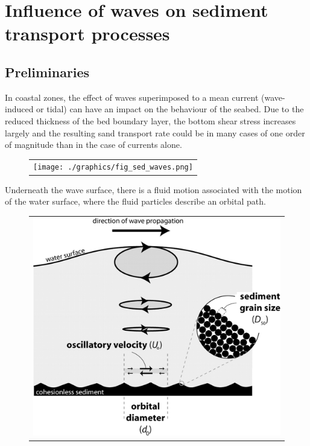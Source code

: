 \chapter[Influence of waves on sediment transport]{Influence of waves on sediment transport processes}

\section{Preliminaries}
In coastal zones, the effect of waves superimposed to a mean current (wave-induced or tidal) can have an impact on the behaviour of the seabed. Due to the reduced thickness of the bed boundary layer, the bottom shear stress increases largely and the resulting sand transport rate could be in many cases of one order of magnitude than in the case of currents alone. 

\begin{figure}[H]%
  \begin{center}
\begin{tabular}{c}
\texttt{[image: ./graphics/fig\_sed\_waves.png]}
\end{tabular}
\end{center}
\end{figure}

Underneath the wave surface, there is a fluid motion associated with the motion of the water surface, where the fluid particles describe an orbital path.

\begin{figure}[H]%
  \begin{center}
\begin{tabular}{c}
\includegraphics[scale=0.12]{./graphics/orbital_large.jpg}
\end{tabular}
\end{center}
\end{figure}

